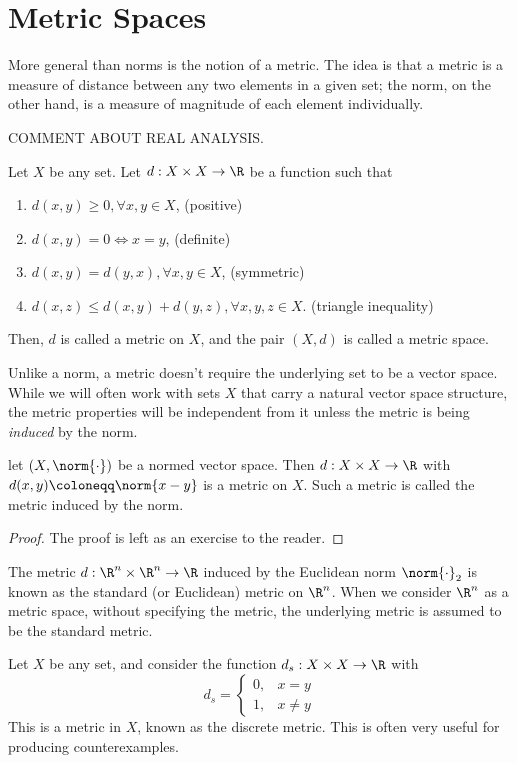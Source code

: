 \section{Metric Spaces}
More general than norms is the notion of a metric. The idea is that a metric is a measure of distance between any two elements in a given set; the norm, on the other hand, is a measure of magnitude of each element individually.

COMMENT ABOUT REAL ANALYSIS.

\begin{ndfn}
  Let $X$ be any set. Let $d : X \times X \to \R$ be a function such that
  \begin{enumerate}
  \item $d(x,y) \geq 0, \forall x,y \in X$, \hfill (positive)
  \item $d(x,y) = 0 \iff x=y$, \hfill (definite)
  \item $d(x,y) = d(y,x), \forall x,y \in X$, \hfill (symmetric)
  \item $d(x,z) \leq d(x,y) + d(y,z), \forall x,y,z \in X$. \hfill (triangle inequality)
  \end{enumerate}
  Then, $d$ is called a metric on $X$, and the pair $(X,d)$ is called a metric space.
\end{ndfn}

Unlike a norm, a metric doesn't require the underlying set to be a vector space. While we will often work with sets $X$ that carry a natural vector space structure, the metric properties will be independent from it unless the metric is being \emph{induced} by the norm.

\begin{nprop}
  let $(X, \norm{\cdot})$ be a normed vector space. Then $d : X \times X \to \R$ with $d(x,y) \coloneqq \norm{x-y}$ is a metric on $X$. Such a metric is called the metric induced by the norm.
\end{nprop}
\begin{proof}
  The proof is left as an exercise to the reader.
\end{proof}

The metric $d:\R^n \times \R^n \to \R$ induced by the Euclidean norm $\norm{\cdot}_2$ is known as the standard (or Euclidean) metric on $\R^n$. When we consider $\R^n$ as a metric space, without specifying the metric, the underlying metric is assumed to be the standard metric.

\begin{negg}
  Let $X$ be any set, and consider the function $d_s:X \times X \to \R$ with
  \begin{equation*}
  d_s = \begin{cases}
  0, & x=y\\
  1, & x \neq y
  \end{cases}
  \end{equation*}
  This is a metric in $X$, known as the discrete metric. This is often very useful for producing counterexamples.\eggqed
\end{negg}

